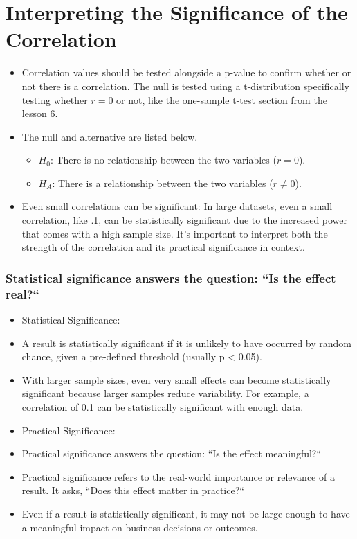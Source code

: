 \documentclass[
  letterpaper,
  DIV=11,
  numbers=noendperiod]{scrreprt}
\providecommand{\tightlist}{%
  \setlength{\itemsep}{0pt}\setlength{\parskip}{0pt}}\usepackage{longtable,booktabs,array}
\begin{document}
\section{Interpreting the Significance of the
Correlation}\label{interpreting-the-significance-of-the-correlation}

\begin{itemize}
\tightlist
\item
  Correlation values should be tested alongside a p-value to confirm
  whether or not there is a correlation. The null is tested using a
  t-distribution specifically testing whether \(r = 0\) or not, like the
  one-sample t-test section from the lesson 6.
\item
  The null and alternative are listed below.

  \begin{itemize}
  \tightlist
  \item
    \(H_0\): There is no relationship between the two variables
    (\(r = 0\)).
  \item
    \(H_A\): There is a relationship between the two variables
    (\(r \neq 0\)).
  \end{itemize}
\item
  Even small correlations can be significant: In large datasets, even a
  small correlation, like .1, can be statistically significant due to
  the increased power that comes with a high sample size. It's important
  to interpret both the strength of the correlation and its practical
  significance in context.
\end{itemize}

\subsubsection{Statistical significance answers the question: ``Is the
effect
real?{}``}\label{statistical-significance-answers-the-question-is-the-effect-real}

\begin{itemize}
\item
  Statistical Significance:
\item
  A result is statistically significant if it is unlikely to have
  occurred by random chance, given a pre-defined threshold (usually p
  \textless{} 0.05).
\item
  With larger sample sizes, even very small effects can become
  statistically significant because larger samples reduce variability.
  For example, a correlation of 0.1 can be statistically significant
  with enough data.
\item
  Practical Significance:
\item
  Practical significance answers the question: ``Is the effect
  meaningful?{}``
\item
  Practical significance refers to the real-world importance or
  relevance of a result. It asks, ``Does this effect matter in
  practice?{}``
\item
  Even if a result is statistically significant, it may not be large
  enough to have a meaningful impact on business decisions or outcomes.
\end{itemize}
\end{document}
